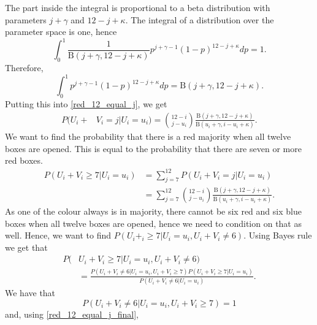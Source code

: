 \documentclass{article}
\begin{document}
The part inside the integral is proportional to a beta distribution with parameters $j+\gamma$ and $12-j+\kappa$. The integral of a distribution over the parameter space is one, hence
\begin{equation*}
    \int_0^1 \frac{1}{\text{B}(j+\gamma,12-j+\kappa)}p^{j+\gamma-1}(1-p)^{12-j+\kappa}dp = 1.
\end{equation*}
Therefore,
\begin{equation*}
    \int_0^1 p^{j+\gamma-1}(1-p)^{12-j+\kappa}dp = \text{B}(j+\gamma,12-j+\kappa).
\end{equation*}
Putting this into \eqref{red_12_equal_j}, we get
\begin{equation}
\label{red_12_equal_j_final}
    \begin{aligned}
        P(U_i+&V_i = j | U_i=u_i) = \binom{12-i}{j-u_i} \frac{\text{B}(j+\gamma,12-j+\kappa)}{\text{B}(u_i+\gamma,i-u_i+\kappa)}.
    \end{aligned}
\end{equation}
We want to find the probability that there is a red majority when all twelve boxes are opened. This is equal to the probability that there are seven or more red boxes. 
\begin{equation}
\label{redmajor1}
    \begin{aligned}
        P(U_i+V_i \geq 7 | U_i=u_i) 
        &= \sum_{j=7}^{12} P(U_i+V_i = j | U_i=u_i)\\[6pt]
        &= \sum_{j=7}^{12} \binom{12-i}{j-u_i} \frac{\text{B}(j+\gamma,12-j+\kappa)}{\text{B}(u_i+\gamma,i-u_i+\kappa)}.
    \end{aligned}
\end{equation}
As one of the colour always is in majority, there cannot be six red and six blue boxes when all twelve boxes are opened, hence we need to condition on that as well. Hence, we want to find $P(U_i+_i \geq 7 | U_i=u_i,U_i+V_i \neq 6)$. Using Bayes rule we get that
\begin{equation}
\label{redmajor2}
    \begin{aligned}
        P(&U_i+V_i \geq 7 | U_i=u_i,U_i+V_i \neq 6) \\[6pt]
        &= \frac{P(U_i+V_i\neq6|U_i=u_i,U_i+V_i\geq7)P(U_i+V_i\geq7|U_i=u_i)}{P(U_i+V_i\neq6|U_i=u_i)}.
    \end{aligned}
\end{equation}
We have that
\begin{equation*}
    P(U_i+V_i\neq6|U_i=u_i,U_i+V_i\geq7)=1
\end{equation*}
and, using \eqref{red_12_equal_j_final},
\end{document}
